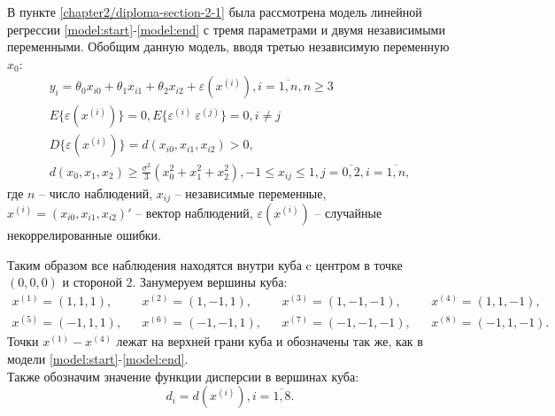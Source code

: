 В пункте \ref{chapter2/diploma-section-2-1} была рассмотрена модель линейной регрессии \eqref{model:start}-\eqref{model:end} с тремя параметрами и двумя независимыми переменными.
Обобщим данную модель, вводя третью независимую переменную $x_0$:
\begin{gather} \label{model-3x:start}
y_i = \theta_0 x_{i0} + \theta_1 x_{i1} + \theta_2 x_{i2} + \varepsilon(x^{(i)}), i = \overline{1, n}, n \ge 3 \\
E\{ \varepsilon(x^{(i)}) \} = 0, E\{ \varepsilon^{(i)}\ \varepsilon^{(j)} \} = 0, i \ne j \\
D\{ \varepsilon(x^{(i)}) \} = d(x_{i0}, x_{i1}, x_{i2}) > 0, \\
d(x_0, x_1, x_2) \ge \frac{\sigma^2}{3}(x_0^2 + x_1^2 + x_2^2) \label{model-3x:end},
-1 \le x_{ij} \le 1, j = \overline{0, 2}, i = \overline{1, n},
\end{gather}
где $n$ -- число наблюдений, $x_{ij}$ -- независимые переменные, $x^{(i)} = (x_{i0}, x_{i1}, x_{i2})'$ -- вектор наблюдений, $\varepsilon(x^{(i)})$ -- случайные некоррелированные ошибки.

Таким образом все наблюдения находятся внутри куба c центром в точке $(0, 0, 0)$ и стороной 2.
Занумеруем вершины куба:
\begin{align*}
x^{(1)} = (1, 1, 1), && x^{(2)} = (1, -1, 1), && x^{(3)} = (1, -1, -1), && x^{(4)} = (1, 1, -1),\\
x^{(5)} = (-1, 1, 1), && x^{(6)} = (-1, -1, 1), && x^{(7)} = (-1, -1, -1), && x^{(8)} = (-1, 1, -1).
\end{align*}
Точки $x^{(1)}-x^{(4)}$ лежат на верхней грани куба и обозначены так же, как в модели \eqref{model:start}-\eqref{model:end}.\\
Также обозначим значение функции дисперсии в вершинах куба:
\begin{equation}
d_i = d(x^{(i)}), i = \overline{1, 8}.
\end{equation}

